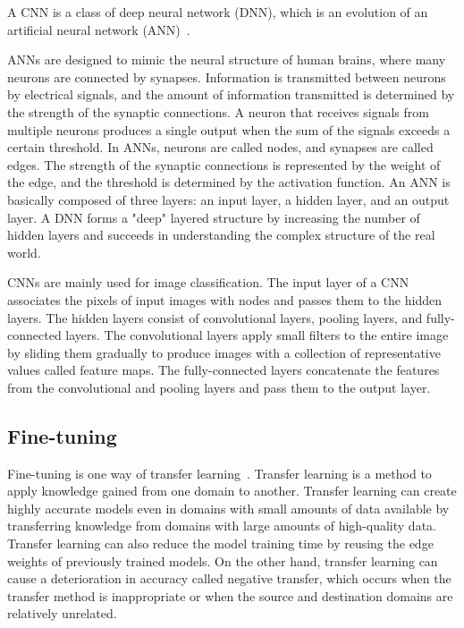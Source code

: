 \documentclass[conference]{IEEEtran}
\begin{document}
A CNN is a class of deep neural network (DNN), which is an evolution of an artificial neural network (ANN)~\cite{10.1145/3234150}.

ANNs are designed to mimic the neural structure of human brains, where many neurons are connected by synapses.
Information is transmitted between neurons by electrical signals, and the amount of information transmitted is determined by the strength of the synaptic connections.
A neuron that receives signals from multiple neurons produces a single output when the sum of the signals exceeds a certain threshold.
In ANNs, neurons are called nodes, and synapses are called edges.
The strength of the synaptic connections is represented by the weight of the edge, and the threshold is determined by the activation function.
An ANN is basically composed of three layers: an input layer, a hidden layer, and an output layer.
A DNN forms a "deep" layered structure by increasing the number of hidden layers and succeeds in understanding the complex structure of the real world.

CNNs are mainly used for image classification.
The input layer of a CNN associates the pixels of input images with nodes and passes them to the hidden layers.
The hidden layers consist of convolutional layers, pooling layers, and fully-connected layers.
The convolutional layers apply small filters to the entire image by sliding them gradually to produce images with a collection of representative values called feature maps.
The fully-connected layers concatenate the features from the convolutional and pooling layers and pass them to the output layer.

\subsection{Fine-tuning}
\label{sec:Fine-tuning}

Fine-tuning is one way of transfer learning~\cite{8107520}.
Transfer learning is a method to apply knowledge gained from one domain to another.
Transfer learning can create highly accurate models even in domains with small amounts of data available by transferring knowledge from domains with large amounts of high-quality data.
Transfer learning can also reduce the model training time by reusing the edge weights of previously trained models.
On the other hand, transfer learning can cause a deterioration in accuracy called negative transfer, which occurs when the transfer method is inappropriate or when the source and destination domains are relatively unrelated.
\end{document}

